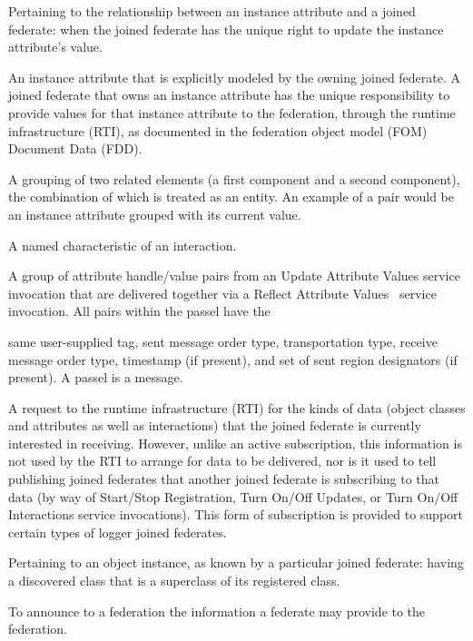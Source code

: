  Pertaining to the relationship between an instance attribute and a joined federate: when the joined federate has the unique right to update the instance attribute's value.

 An instance attribute that is explicitly modeled by the owning joined federate. A joined federate that owns an instance attribute has the unique responsibility to provide values for that instance attribute to the federation, through the runtime infrastructure (RTI), as documented in the federation object model (FOM) Document Data (FDD).

 A grouping of two related elements (a first component and a second component), the combination of which is treated as an entity. An example of a pair would be an instance attribute grouped with its current value.

 A named characteristic of an interaction.

 A group of attribute handle/value pairs from an Update Attribute Values service invocation that are delivered together via a Reflect Attribute Values \rtiinitiated\ service invocation. All pairs within the passel have the

\clearpage
same user-supplied tag, sent message order type, transportation type, receive message order type, timestamp (if present), and set of sent region designators (if present). A passel is a message.

 A request to the runtime infrastructure (RTI) for the kinds of data (object classes and attributes as well as interactions) that the joined federate is currently interested in receiving. However, unlike an active subscription, this information is not used by the RTI to arrange for data to be delivered, nor is it used to tell publishing joined federates that another joined federate is subscribing to that data (by way of Start/Stop Registration, Turn On/Off Updates, or Turn On/Off Interactions service invocations). This form of subscription is provided to support certain types of logger joined federates.

 Pertaining to an object instance, as known by a particular joined federate: having a discovered class that is a superclass of its registered class.

 To announce to a federation the information a federate may provide to the federation.

